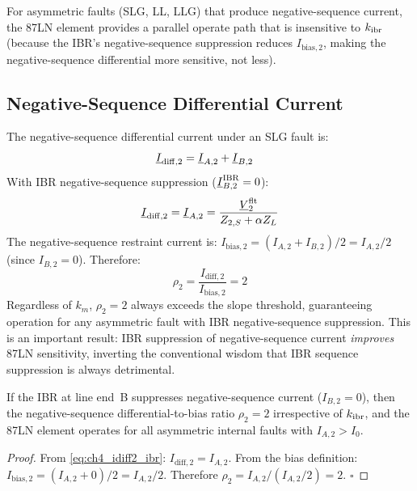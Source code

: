 For asymmetric faults (SLG, LL, LLG) that produce negative-sequence
current, the 87LN element provides a parallel operate path that is
insensitive to $k_\mathrm{ibr}$ (because the IBR's negative-sequence suppression
reduces $I_\mathrm{bias,2}$, making the negative-sequence differential
more sensitive, not less).

\subsection{Negative-Sequence Differential Current}

The negative-sequence differential current under an SLG fault is:
\begin{align}
  \underline{I}_\mathrm{diff,2} &= \underline{I}_{A,2} + \underline{I}_{B,2}
  \label{eq:ch4_idiff2}
\end{align}
With IBR negative-sequence suppression ($\underline{I}_{B,2}^\mathrm{IBR} = 0$):
\begin{equation}
  \underline{I}_\mathrm{diff,2} = \underline{I}_{A,2}
  = \frac{\underline{V}_2^\mathrm{flt}}{Z_{2,S} + \alpha Z_L}
  \label{eq:ch4_idiff2_ibr}
\end{equation}
The negative-sequence restraint current is:
$I_\mathrm{bias,2} = (I_{A,2} + I_{B,2})/2 = I_{A,2}/2$
(since $I_{B,2} = 0$). Therefore:
\begin{equation}
  \rho_2 = \frac{I_\mathrm{diff,2}}{I_\mathrm{bias,2}} = 2
  \label{eq:ch4_rho2}
\end{equation}
Regardless of $k_m$, $\rho_2 = 2$ always exceeds the slope threshold,
guaranteeing operation for any asymmetric fault with IBR negative-sequence
suppression. This is an important result: IBR suppression of negative-sequence
current \emph{improves} 87LN sensitivity, inverting the conventional wisdom
that IBR sequence suppression is always detrimental.

\begin{proposition}
\label{prop:ch4_87ln}
If the IBR at line end~B suppresses negative-sequence current
($I_{B,2} = 0$), then the negative-sequence differential-to-bias ratio
$\rho_2 = 2$ irrespective of $k_\mathrm{ibr}$, and the 87LN element operates for
all asymmetric internal faults with $I_{A,2} > I_0$.
\end{proposition}

\begin{proof}
From \eqref{eq:ch4_idiff2_ibr}: $I_\mathrm{diff,2} = I_{A,2}$.
From the bias definition: $I_\mathrm{bias,2} = (I_{A,2} + 0)/2 = I_{A,2}/2$.
Therefore $\rho_2 = I_{A,2}/(I_{A,2}/2) = 2$. \qquad $\square$
\end{proof}

